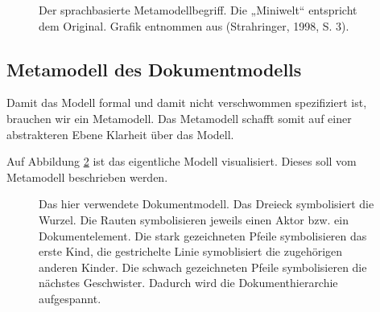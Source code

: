  
\begin{figure}[h!]
\centering
\advance\leftskip-2.5cm
\caption{ Der sprachbasierte Metamodellbegriff. Die „Miniwelt“ entspricht dem Original. Grafik entnommen aus (Strahringer, 1998, S. 3). }\label{metamodellbegriff}
\end{figure}
 
\subsection{Metamodell des Dokumentmodells}\label{metamodell_dokument}
 
Damit das Modell formal und damit nicht verschwommen spezifiziert ist, brauchen wir ein Metamodell. Das Metamodell schafft somit auf einer abstrakteren Ebene Klarheit über das Modell.

 
Auf Abbildung \ref{docmodell} ist das eigentliche Modell visualisiert. Dieses soll vom Metamodell beschrieben werden.

 
\begin{figure}[h!]
\centering
\advance\leftskip-2.5cm
\caption{ Das hier verwendete Dokumentmodell. Das Dreieck symbolisiert die Wurzel. Die Rauten symbolisieren jeweils einen Aktor bzw. ein Dokumentelement. Die stark gezeichneten Pfeile symbolisieren das erste Kind, die gestrichelte Linie symoblisiert die zugehörigen anderen Kinder. Die schwach gezeichneten Pfeile symbolisieren die nächstes Geschwister. Dadurch wird die Dokumenthierarchie aufgespannt. }\label{docmodell}
\end{figure}
 
